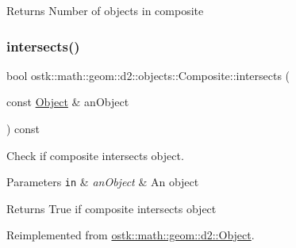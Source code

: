 \begin{DoxyReturn}{Returns}
Number of objects in composite 
\end{DoxyReturn}
\mbox{\label{classostk_1_1math_1_1geom_1_1d2_1_1objects_1_1_composite_a316fa117952c61b5e7217a9e38528ab7}} 
\subsubsection{\texorpdfstring{intersects()}{intersects()}\hspace{0.1cm}{\footnotesize\ttfamily [1/2]}}
{\footnotesize\ttfamily bool ostk\+::math\+::geom\+::d2\+::objects\+::\+Composite\+::intersects (\begin{DoxyParamCaption}\item[{const \hyperlink{classostk_1_1math_1_1geom_1_1d2_1_1_object}{Object} \&}]{an\+Object }\end{DoxyParamCaption}) const\hspace{0.3cm}{\ttfamily [virtual]}}



Check if composite intersects object. 


\begin{DoxyParams}[1]{Parameters}
\mbox{\tt in}  & {\em an\+Object} & An object \\
\hline
\end{DoxyParams}
\begin{DoxyReturn}{Returns}
True if composite intersects object 
\end{DoxyReturn}


Reimplemented from \hyperlink{classostk_1_1math_1_1geom_1_1d2_1_1_object_a8791f58dd95e68a1eb4271aa15f7cd12}{ostk\+::math\+::geom\+::d2\+::\+Object}.

\mbox{\label{classostk_1_1math_1_1geom_1_1d2_1_1objects_1_1_composite_a73b8fe31b81d248da2a91b01805829f6}} 
